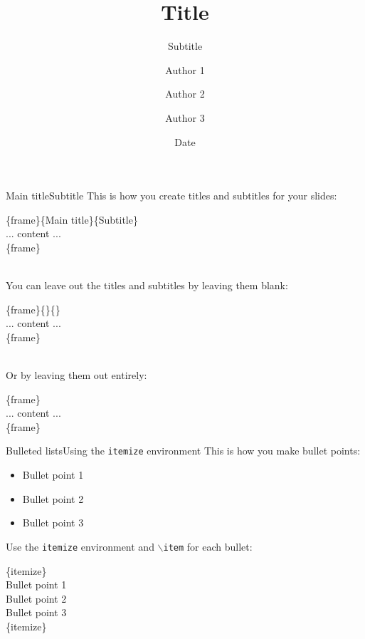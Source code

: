 \documentclass[aspectratio=169]{beamer}
\title[]{Title}
\subtitle[]{Subtitle}
\author[Short Author Names] %
{Author 1\inst{1} \and Author 2\inst{1,2} \and Author 3\inst{2}}
\institute[Short Inst Names] %
{
  \inst{1}%
  Institution 1 \\
  \inst{2}%
  Institution 2
} %
\date[Short Date]{Date}
\begin{document}
\begin{frame}
	\titlepage
\end{frame}



\begin{frame}{Main title}{Subtitle}
	This is how you create titles and subtitles for your slides:
	\begin{codesnippet}
		\{frame\}\{Main title\}\{Subtitle\} \\
		\ind ... content ... \\
		\{frame\}
	\end{codesnippet} \\
	\vspace{0.5cm}
	You can leave out the titles and subtitles by leaving them blank:
	\begin{codesnippet}
		\{frame\}\{\}\{\} \\
		\ind ... content ... \\
		\{frame\}
	\end{codesnippet} \\
	\vspace{0.5cm}
	Or by leaving them out entirely:
	\begin{codesnippet}
		\{frame\} \\
		\ind ... content ... \\
		\{frame\}
	\end{codesnippet}
\end{frame}

\begin{frame}{Bulleted lists}{Using the {\tt itemize} environment}
	This is how you make bullet points:
	\begin{itemize}
		\item Bullet point 1
		\item Bullet point 2
		\item Bullet point 3
	\end{itemize}

	Use the {\tt itemize} environment and {\tt $\backslash$item} for each bullet:\\
	\vspace{0.2cm}
	\begin{codesnippet}
		\{itemize\} \\
		\ind \ind {} Bullet point 1 \\
		\ind \ind {} Bullet point 2 \\
		\ind \ind {} Bullet point 3 \\
		\{itemize\}
	\end{codesnippet}
\end{frame}
\end{document}
